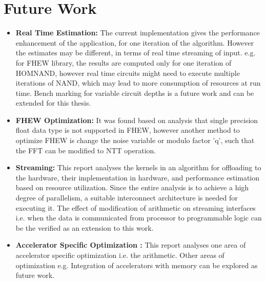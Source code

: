 \section{Future Work}
\begin{itemize}
\item
\textbf{Real Time Estimation:} The current implementation gives the performance enhancement of the application, for one iteration of the algorithm. However the estimates may be different, in terms of real time streaming of input. e.g. for FHEW library, the results are computed only for one iteration of HOMNAND, however real time circuits might need to execute multiple iterations of NAND, which may lead to more consumption of resources at run time. Bench marking for variable circuit depths is a future work and can be extended for this thesis.
\item
\textbf{FHEW Optimization:} It was found based on analysis that single precision float data type is not supported in FHEW, however another method to optimize FHEW is change the noise variable or modulo factor 'q', such that the FFT can be modified to NTT operation. 
\item
\textbf{Streaming:} This report analyses the kernels in an algorithm for offloading to the hardware, their implementation in hardware, and performance estimation based on resource utilization.  Since the entire analysis is to achieve a high degree of parallelism, a suitable interconnect architecture is needed for executing it. The effect of modification of arithmetic on streaming interfaces i.e. when the data is communicated from processor to programmable logic can be the verified as an extension to this work.
\item
\textbf{Accelerator Specific Optimization :} This report analyses one area of accelerator specific optimization i.e. the arithmetic. Other areas of optimization e.g. Integration of accelerators with memory can be explored as future work.

\end{itemize}




